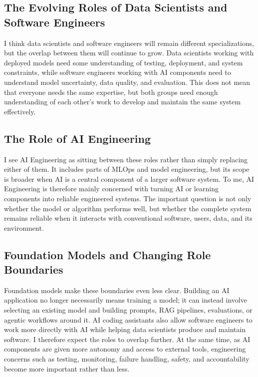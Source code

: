 \documentclass[11pt,a4paper]{article}
\begin{document}
\subsection{The Evolving Roles of Data Scientists and Software Engineers}

I think data scientists and software engineers will remain different specializations, but the overlap between them will continue to grow. Data scientists working with deployed models need some understanding of testing, deployment, and system constraints, while software engineers working with AI components need to understand model uncertainty, data quality, and evaluation. This does not mean that everyone needs the same expertise, but both groups need enough understanding of each other's work to develop and maintain the same system effectively.

\subsection{The Role of AI Engineering}

I see AI Engineering as sitting between these roles rather than simply replacing either of them. It includes parts of MLOps and model engineering, but its scope is broader when AI is a central component of a larger software system. To me, AI Engineering is therefore mainly concerned with turning AI or learning components into reliable engineered systems. The important question is not only whether the model or algorithm performs well, but whether the complete system remains reliable when it interacts with conventional software, users, data, and its environment.

\subsection{Foundation Models and Changing Role Boundaries}

Foundation models make these boundaries even less clear. Building an AI application no longer necessarily means training a model; it can instead involve selecting an existing model and building prompts, RAG pipelines, evaluations, or agentic workflows around it. AI coding assistants also allow software engineers to work more directly with AI while helping data scientists produce and maintain software. I therefore expect the roles to overlap further. At the same time, as AI components are given more autonomy and access to external tools, engineering concerns such as testing, monitoring, failure handling, safety, and accountability become more important rather than less.
\end{document}
